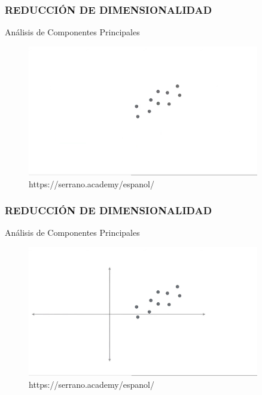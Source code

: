 \documentclass{beamer}
\begin{document}
\begin{frame}
\frametitle{REDUCCIÓN DE DIMENSIONALIDAD}
\begin{block}{Análisis de Componentes Principales}	
	\begin{figure}
		\includegraphics[width=0.9\textwidth]{PCA/IMG_3562.jpg}
		\caption{https://serrano.academy/espanol/}
	\end{figure}
\end{block}
\end{frame}

\begin{frame}
\frametitle{REDUCCIÓN DE DIMENSIONALIDAD}
\begin{block}{Análisis de Componentes Principales}	
	\begin{figure}
		\includegraphics[width=0.9\textwidth]{PCA/IMG_3563.jpg}
		\caption{https://serrano.academy/espanol/}
	\end{figure}
\end{block}
\end{frame}
\end{document}
